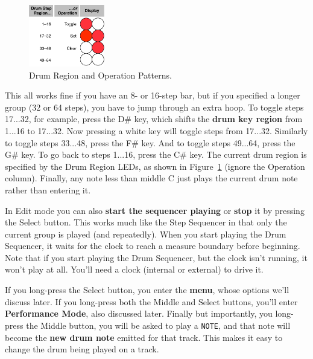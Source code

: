 \documentclass{article}
\begin{document}
\begin{figure}
\vspace{-1em}
\hspace{\fill}\includegraphics[width=1.3in]{drumregion}\hspace{\fill}%
\vspace{-1em}
\caption{\small Drum Region and Operation Patterns.}\vspace{-1em}
\label{drumregionpatterns}
\end{figure}


This all works fine if you have an 8- or 16-step bar, but if you specified a longer group (32 or 64 steps), you have to jump through an extra hoop.  To toggle steps 17...32, for example, press the D\# key, which shifts the {\bf drum key region} from 1...16 to 17...32.  Now pressing a white key will toggle steps from 17...32.  Similarly to toggle steps 33...48, press the F\# key.  And to toggle steps 49...64, press the G\# key.  To go back to steps 1...16, press the C\# key.  The current drum region is specified by the Drum Region LEDs, as shown in Figure~\ref{drumregionpatterns} (ignore the Operation column).  Finally, any note less than middle C just plays the current drum note rather than entering it.



In Edit mode you can also {\bf start the sequencer playing} or {\bf stop} it by pressing the Select button.  This works much like the Step Sequencer in that only the current group is played (and repeatedly).  When you start playing the Drum Sequencer, it waits for the clock to reach a measure boundary before beginning.  Note that if you start playing the Drum Sequencer, but the clock isn't running, it won't play at all.  You'll need a clock (internal or external) to drive it.

If you long-press the Select button, you enter the {\bf menu}, whose options we'll discuss later.    If you long-press both the Middle and Select buttons, you'll enter {\bf Performance Mode}, also discussed later.  Finally but importantly, you long-press the Middle button, you will be asked to play a {\tt NOTE}, and that note will become the {\bf new drum note}  emitted for that track.  This makes it easy to change the drum being played on a track.  
\end{document}

